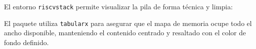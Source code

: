 \documentclass[11pt,a4paper]{article}
\begin{document}
El entorno \texttt{riscvstack} permite visualizar la pila de forma técnica y limpia:

\begin{riscvstack}
\end{riscvstack}

El paquete \RiScVTeX utiliza \texttt{tabularx} para asegurar que el mapa de memoria ocupe todo el ancho disponible, manteniendo el contenido centrado y resaltado con el color de fondo definido.
\end{document}
